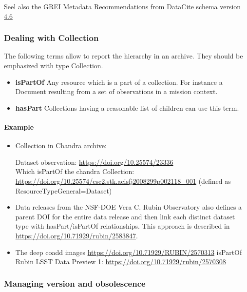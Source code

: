 \documentclass[11pt,a4paper]{ivoa}
\begin{document}
Seel also the \href{https://zenodo.org/records/16953589}{GREI Metadata Recommendations from DataCite schema version 4.6}

\subsubsection{Dealing with Collection}
The following terms allow to report the hierarchy in an archive. They should be emphasized with type Collection.

\begin{itemize}
\item{} \textbf{isPartOf}\newline
Any resource which is a part of a collection. For instance a Document resulting from a set of observations in a mission context.
\item{} \textbf{hasPart}\newline
Collections having a reasonable list of children can use this term.
\end{itemize}

\paragraph{Example} 
\begin{itemize}
	\item Collection in Chandra archive:

Dataset observation: \url{https://doi.org/10.25574/23336}\\
Which isPartOf the chandra Collection: \url{https://doi.org/10.25574/csc2.stk.acisfj2008299p002118_001} (defined as ResourceTypeGeneral=Dataset)\\


\item Data releases from the NSF-DOE Vera C. Rubin Observatory also defines a parent DOI for the entire data release and then link each distinct dataset type with hasPart/isPartOf relationships. This approach is described in \url{https://doi.org/10.71929/rubin/2583847}.


\item The deep coadd images \url{https://doi.org/10.71929/RUBIN/2570313} isPartOf Rubin LSST Data Preview 1: \url{https://doi.org/10.71929/rubin/2570308}
\end{itemize}

\subsubsection{Managing version and obsolescence}
\end{document}
